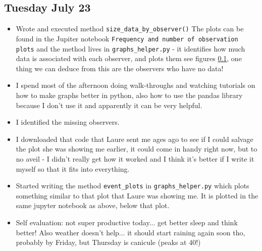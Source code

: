 \documentclass[12pt]{article}
\begin{document}
\subsection{Tuesday July 23}
\begin{itemize}
    \item Wrote and executed method \texttt{size\_data\_by\_observer()} The plots can be found in the Jupiter notebook \texttt{Frequency and number of observation plots} and the method lives in \texttt{graphs\_helper.py} - it identifies how much data is associated with each observer, and plots them see figures \ref{}, one thing we can deduce from this are the observers who have no data!
    \item I spend most of the afternoon doing walk-throughs and watching tutorials on how to make graphs better in python, also how to use the pandas library because I don't use it and apparently it can be very helpful.
    \item I identified the missing observers.
    \item I downloaded that code that Laure sent me ages ago to see if I could salvage the plot she was showing me earlier, it could come in handy right now, but to no aveil - I didn't really get how it worked and I think it's better if I write it myself so that it fits into everything.
    \item Started writing the method \texttt{event\_plots} in \texttt{graphs\_helper.py} which plots something similar to that plot that Laure was showing me. It is plotted in the same jupyter notebook as above, below that plot.
    \item Self evaluation: not super productive today... get better sleep and think better! Also weather doesn't help... it should start raining again soon tho, probably by Friday, but Thursday is canicule (peaks at 40!)
\end{itemize}
\end{document}
